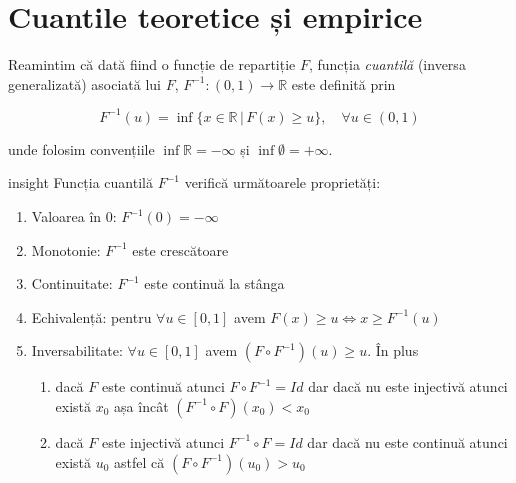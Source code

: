 \documentclass[]{article}
\newenvironment{Shaded}{\begin{snugshade}}{\end{snugshade}}
\newcommand{\KeywordTok}[1]{\textcolor[rgb]{0.13,0.29,0.53}{\textbf{#1}}}
\newcommand{\DecValTok}[1]{\textcolor[rgb]{0.00,0.00,0.81}{#1}}
\newcommand{\OperatorTok}[1]{\textcolor[rgb]{0.81,0.36,0.00}{\textbf{#1}}}
\newcommand{\NormalTok}[1]{#1}
\providecommand{\tightlist}{%
  \setlength{\itemsep}{0pt}\setlength{\parskip}{0pt}}
\newenvironment{frshaded_insight*}{%
  \def\FrameCommand{\fboxrule=\FrameRule\fboxsep=\FrameSep \fcolorbox{framecolor_insight}{shadecolor_insight}}%
  \MakeFramed {\advance\hsize-\width \FrameRestore}}%
{\endMakeFramed}
\newenvironment{rmdblock_insight}[1]
  {\begin{frshaded_insight*}
  \begin{itemize}
  \renewcommand{\labelitemi}{
    \raisebox{-.7\height}[0pt][0pt]{
      {\setkeys{Gin}{width=2em,keepaspectratio}\texttt{[image: images/icons/\#1]}}
    }
  }
  \item
  }
  {
  \end{itemize}
  \end{frshaded_insight*}
  }
\newenvironment{rmdinsight}
  {\begin{rmdblock_insight}{insight}}
  {\end{rmdblock_insight}}
\begin{document}
\begin{Shaded}
\end{Shaded}

\hypertarget{sec:cuantile}{\section{Cuantile teoretice și
empirice}\label{sec:cuantile}}

Reamintim că dată fiind o funcție de repartiție \(F\), funcția
\emph{cuantilă} (inversa generalizată) asociată lui \(F\),
\(F^{-1}:(0,1)\to\mathbb{R}\) este definită prin

\[
  F^{-1}(u) = \inf\{x\in\mathbb{R}\,|\,F(x)\geq u\}, \quad \forall u\in(0,1)
\]

unde folosim convențiile \(\inf\mathbb{R} = -\infty\) și
\(\inf\emptyset = +\infty\).

\begin{rmdinsight}
Funcția cuantilă \(F^{-1}\) verifică următoarele proprietăți:

\begin{enumerate}
\def\labelenumi{\arabic{enumi})}
\tightlist
\item
  Valoarea în \(0\): \(F^{-1}(0) = -\infty\)
\item
  Monotonie: \(F^{-1}\) este crescătoare
\item
  Continuitate: \(F^{-1}\) este continuă la stânga
\item
  Echivalență: pentru \(\forall u\in[0,1]\) avem
  \(F(x)\geq u \iff x\geq F^{-1}(u)\)
\item
  Inversabilitate: \(\forall u\in[0,1]\) avem
  \((F\circ F^{-1})(u)\geq u\). În plus

  \begin{enumerate}
  \def\labelenumii{\alph{enumii})}
  \tightlist
  \item
    dacă \(F\) este continuă atunci \(F\circ F^{-1} = Id\) dar dacă nu
    este injectivă atunci există \(x_0\) așa încât
    \((F^{-1}\circ F)(x_0)<x_0\)
  \item
    dacă \(F\) este injectivă atunci \(F^{-1}\circ F = Id\) dar dacă nu
    este continuă atunci există \(u_0\) astfel că
    \((F\circ F^{-1})(u_0)>u_0\)
  \end{enumerate}
\end{enumerate}
\end{rmdinsight}
\end{document}
